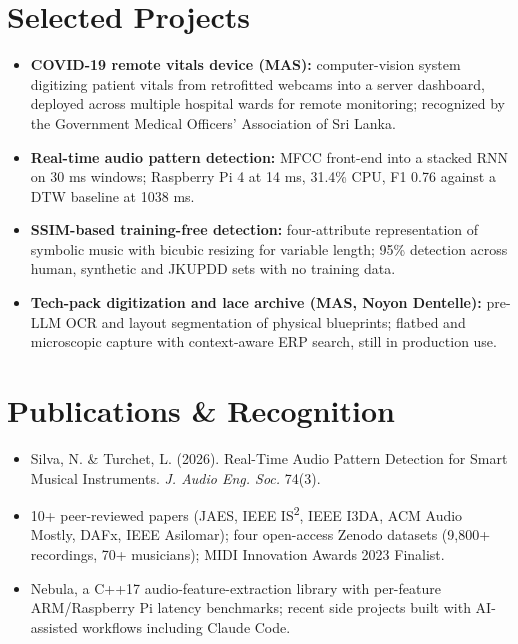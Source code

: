 \documentclass[11pt]{article}
\begin{document}
\section*{Selected Projects \footnotesize {}}
\begin{itemize}[leftmargin=1.2em, itemsep=-0.25em]
    \item \textbf{COVID-19 remote vitals device (MAS):} computer-vision system digitizing patient vitals from retrofitted webcams into a server dashboard, deployed across multiple hospital wards for remote monitoring; recognized by the Government Medical Officers' Association of Sri Lanka.
    \item \textbf{Real-time audio pattern detection:} MFCC front-end into a stacked RNN on 30 ms windows; Raspberry Pi 4 at 14 ms, 31.4\% CPU, F1 0.76 against a DTW baseline at 1038 ms.
    \item \textbf{SSIM-based training-free detection:} four-attribute representation of symbolic music with bicubic resizing for variable length; 95\% detection across human, synthetic and JKUPDD sets with no training data.
    \item \textbf{Tech-pack digitization and lace archive (MAS, Noyon Dentelle):} pre-LLM OCR and layout segmentation of physical blueprints; flatbed and microscopic capture with context-aware ERP search, still in production use.
\end{itemize}

\enlargethispage{3\baselineskip}
\vspace{-0.5em}
\section*{Publications \& Recognition}
\begin{itemize}[leftmargin=1.2em, itemsep=-0.25em]
    \item Silva, N. \& Turchet, L. (2026). Real-Time Audio Pattern Detection for Smart Musical Instruments. \textit{J. Audio Eng. Soc.} 74(3).
    \item 10+ peer-reviewed papers (JAES, IEEE IS\textsuperscript{2}, IEEE I3DA, ACM Audio Mostly, DAFx, IEEE Asilomar); four open-access Zenodo datasets (9,800+ recordings, 70+ musicians); MIDI Innovation Awards 2023 Finalist.
    \item Nebula, a C++17 audio-feature-extraction library with per-feature ARM/Raspberry Pi latency benchmarks; recent side projects built with AI-assisted workflows including Claude Code.
\end{itemize}
\end{document}
